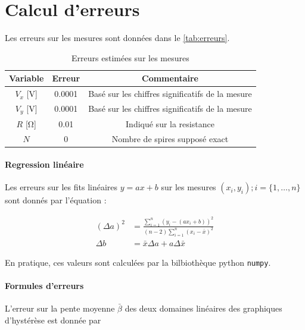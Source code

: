 \section{Calcul d'erreurs}
\label{sec:erreurs}

Les erreurs sur les mesures sont données dans le \autoref{tab:erreurs}.

\begin{table}
    \centering
    \begin{tabulary}{\textwidth}{C C C}
        \toprule
        Variable & Erreur & Commentaire \\
        \midrule
        \(V_x\) [\si{\volt}] & 0.0001 & Basé sur les chiffres significatifs de la mesure \\
        \(V_y\) [\si{\volt}] & 0.0001 & Basé sur les chiffres significatifs de la mesure \\
        \(R\) [\si{\ohm}] & 0.01 & Indiqué sur la resistance \\
        \(N\) & 0 & Nombre de spires supposé exact \\
        \bottomrule
    \end{tabulary}
    \caption{Erreurs estimées sur les mesures}
    \label{tab:erreurs}
\end{table}

\paragraph*{Regression linéaire}
Les erreurs sur les fits linéaires \(y = ax + b\) sur les mesures \((x_i, y_i) ; i = \{1, \hdots, n\}\) sont donnés par l'équation \cite{erreursmesure}:

\begin{equation}
    \label{eq:erreur:fit}
    \begin{aligned}
        (\Delta a)^2 &= \frac{\sum_{i=1}^{n}(y_i - (a x_i + b))^2}{(n-2) \sum_{i=1}^{n}(x_i - \bar{x})^2}\\
        \Delta b &= \bar{x} \Delta a + a \Delta \bar{x}
    \end{aligned}
\end{equation}

En pratique, ces valeurs sont calculées par la bilbiothèque python \texttt{numpy}.

\paragraph*{Formules d'erreurs}
L'erreur sur la pente moyenne \(\bar{\beta}\) des deux domaines linéaires des graphiques d'hystérèse est donnée par

